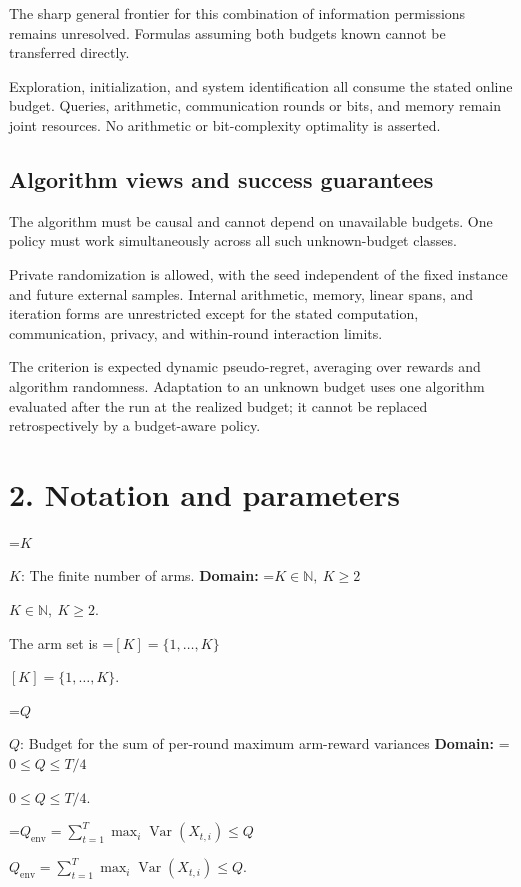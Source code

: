\documentclass[10pt,a4paper]{article}
\newcommand{\AtlasMath}[1]{\par\begingroup\centering\setbox0=\hbox{$\displaystyle #1$}\ifdim\wd0>1.4\linewidth\typeout{ATLAS WIDE FORMULA: \the\wd0}\fi\ifdim\wd0>\linewidth\resizebox{\linewidth}{!}{\box0}\else\box0\fi\par\endgroup}
\newcommand{\AtlasInlineMath}[1]{\begingroup\setbox0=\hbox{$#1$}\ifdim\wd0>.4\linewidth\endgroup\AtlasMath{#1}\else\endgroup$#1$\fi}
\begin{document}
The sharp general frontier for this combination of information permissions remains unresolved. Formulas assuming both budgets known cannot be transferred directly.



Exploration, initialization, and system identification all consume the stated online budget. Queries, arithmetic, communication rounds or bits, and memory remain joint resources. No arithmetic or bit-complexity optimality is asserted.



\subsection{Algorithm views and success guarantees}


The algorithm must be causal and cannot depend on unavailable budgets. One policy must work simultaneously across all such unknown-budget classes.



Private randomization is allowed, with the seed independent of the fixed instance and future external samples. Internal arithmetic, memory, linear spans, and iteration forms are unrestricted except for the stated computation, communication, privacy, and within-round interaction limits.



The criterion is expected dynamic pseudo-regret, averaging over rewards and algorithm randomness. Adaptation to an unknown budget uses one algorithm evaluated after the run at the realized budget; it cannot be replaced retrospectively by a budget-aware policy.



\section{2. Notation and parameters}


\AtlasInlineMath{K}: The finite number of arms. \textbf{Domain:} \AtlasInlineMath{K\in\mathbb N,\ K\ge2}.



The arm set is \AtlasInlineMath{[K]=\{1,\ldots,K\}}.



\AtlasInlineMath{Q}: Budget for the sum of per-round maximum arm-reward variances \textbf{Domain:} \AtlasInlineMath{0\le Q\le T/4}.



\AtlasInlineMath{Q_{\mathrm{env}}=\sum_{t=1}^T\max_i\operatorname{Var}(X_{t,i})\le Q}.
\end{document}

